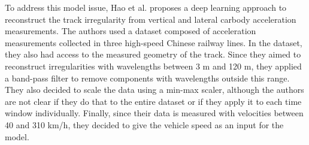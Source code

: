 To address this model issue, Hao et al. \cite{Hao02012023} proposes a deep learning approach to reconstruct the track irregularity from vertical and lateral carbody acceleration measurements. The authors used a dataset composed of acceleration measurements collected in three high-speed Chinese railway lines. In the dataset, they also had access to the measured geometry of the track. Since they aimed to reconstruct irregularities with wavelengths between 3 m and 120 m, they applied a band-pass filter to remove components with wavelengths outside this range. They also decided to scale the data using a min-max scaler, although the authors are not clear if they do that to the entire dataset or if they apply it to each time window individually. Finally, since their data is measured with velocities between 40 and 310 km/h, they decided to give the vehicle speed as an input for the model.


